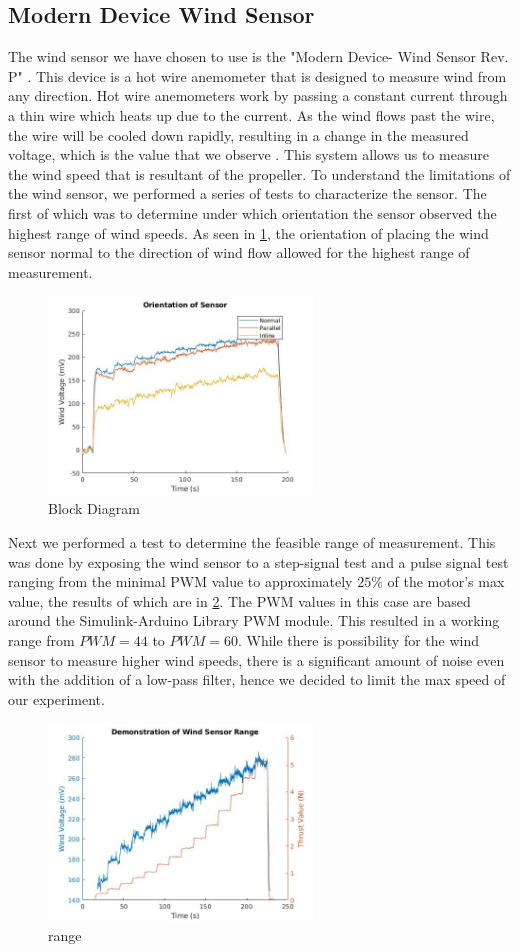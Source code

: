 \documentclass[conference]{IEEEtran}
\begin{document}
\subsection{Modern Device Wind Sensor}
The wind sensor we have chosen to use is the "Modern Device- Wind Sensor Rev. P" \cite{md}. This device is a hot wire anemometer that is designed to measure wind from any direction. Hot wire anemometers work by passing a constant current through a thin wire which heats up due to the current. As the wind flows past the wire, the wire will be cooled down rapidly, resulting in a change in the measured voltage, which is the value that we observe \cite{hot_wire}. This system allows us to measure the wind speed that is resultant of the propeller. 
To understand the limitations of the wind sensor, we performed a series of tests to characterize the sensor. The first of which was to determine under which orientation the sensor observed the highest range of wind speeds. As seen in \ref{orientation}, the orientation of placing the wind sensor normal to the direction of wind flow allowed for the highest range of measurement. 
	\begin{figure}[htbp]
	\includegraphics[width=7cm]{images/figure_1/orientation.jpg}
	\caption{Block Diagram}
	\label{orientation}
\end{figure}
Next we performed a test to determine the feasible range of measurement. This was done by exposing the wind sensor to a step-signal test and a pulse signal test ranging from the minimal PWM value to approximately $25\%$ of the motor's max value, the results of which are in \ref{range}. The PWM values in this case are based around the Simulink-Arduino Library PWM module.  This resulted in a working range from $PWM = 44$ to $PWM = 60$. While there is possibility for the wind sensor to measure higher wind speeds, there is a significant amount of noise even with the addition of a low-pass filter, hence we decided to limit the max speed of our experiment.
	\begin{figure}[htbp]
	\includegraphics[width=7cm]{images/figure_1/range.jpg}
	\caption{range}
	\label{range}
\end{figure}
 
\end{document}
